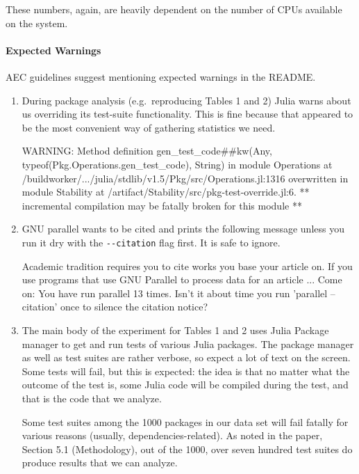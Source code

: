 \documentclass[
]{article}
\begin{document}
These numbers, again, are heavily dependent on the number of CPUs
available on the system.

\hypertarget{expected-warnings}{%
\paragraph{Expected Warnings}\label{expected-warnings}}

AEC guidelines suggest mentioning expected warnings in the README.

\begin{enumerate}
\def\labelenumi{\arabic{enumi}.}
\item
  During package analysis (e.g.~reproducing Tables 1 and 2) Julia warns
  about us overriding its test-suite functionality. This is fine because
  that appeared to be the most convenient way of gathering statistics we
  need.

\begin{verbnobox}[\small]
WARNING: Method definition gen_test_code##kw(Any, typeof(Pkg.Operations.gen_test_code), String)
  in module Operations at /buildworker/.../julia/stdlib/v1.5/Pkg/src/Operations.jl:1316
  overwritten in module Stability at /artifact/Stability/src/pkg-test-override.jl:6.
  ** incremental compilation may be fatally broken for this module **
\end{verbnobox}
\item
  GNU parallel wants to be cited and prints the following message unless
  you run it dry with the \texttt{-\/-citation} flag first. It is safe
  to ignore.

\begin{verbnobox}[\small]
Academic tradition requires you to cite works you base your article on.
If you use programs that use GNU Parallel to process data for an article
...
Come on: You have run parallel 13 times. Isn't it about time 
you run 'parallel --citation' once to silence the citation notice?
\end{verbnobox}
\item
  The main body of the experiment for Tables 1 and 2 uses Julia Package
  manager to get and run tests of various Julia packages. The package
  manager as well as test suites are rather verbose, so expect a lot of
  text on the screen. Some tests will fail, but this is expected: the
  idea is that no matter what the outcome of the test is, some Julia code
  will be compiled during the test, and that is the code that we analyze.

  Some test suites among the 1000 packages in our data set will fail fatally for
  various reasons (usually, dependencies-related). As noted in the
  paper, Section 5.1 (Methodology), out of the 1000, over seven hundred test
  suites do produce results that we can analyze.
\end{enumerate}
\end{document}
